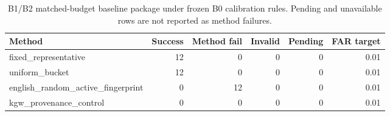 \begin{table}[t]
\centering
\small
\begin{tabular}{lrrrrr}
\toprule
Method & Success & Method fail & Invalid & Pending & FAR target \\
\midrule
fixed\_representative & 12 & 0 & 0 & 0 & 0.01 \\
uniform\_bucket & 12 & 0 & 0 & 0 & 0.01 \\
english\_random\_active\_fingerprint & 0 & 12 & 0 & 0 & 0.01 \\
kgw\_provenance\_control & 0 & 0 & 0 & 0 & 0.01 \\
\bottomrule
\end{tabular}
\caption{B1/B2 matched-budget baseline package under frozen B0 calibration rules. Pending and unavailable rows are not reported as method failures.}
\end{table}

